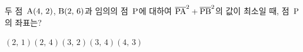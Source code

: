 두 점~$\mathrm{A}(4,\,2)$, $\mathrm{B}(2,\,6)$과 임의의 점~$\mathrm{P}$에 대하여 $\overline{\mathrm{PA}}^2+\overline{\mathrm{PB}}^2$의 값이 최소일 때, 점~$\mathrm{P}$의 좌표는?
\begin{choices32}{$(2,\,1)$}{$(2,\,4)$}{$(3,\,2)$}{$(3,\,4)$}{$(4,\,3)$}\end{choices32}
